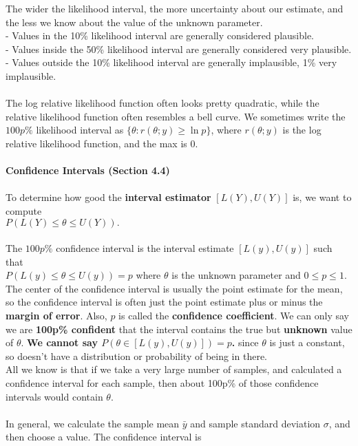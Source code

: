 \documentclass[a4paper,12pt]{article}
\begin{document}
The wider the likelihood interval, the more uncertainty about our estimate, and the less we know about the value of the unknown parameter. 
\\ - Values in the 10\% likelihood interval are generally considered plausible. 
\\ - Values inside the 50\% likelihood interval are generally considered very plausible. 
\\ - Values outside the 10\% likelihood interval are generally implausible, 1\% very implausible.
\\
\\The log relative likelihood function often looks pretty quadratic, while the relative likelihood function often resembles a bell curve. We sometimes write the $100p\%$ likelihood interval as 
$\{ \theta : r(\theta; y) \geq \ln p \}$,
where $r(\theta; y)$ is the log relative likelihood function, and the max is 0.
\\
\\\textbf{Confidence Intervals (Section 4.4)}
\\
\\ To determine how good the\textbf{ interval estimator} $[L(Y), U(Y)]$ is, we want to compute 
\\$ P(L(Y) \leq \theta \leq U(Y)).$
\\
\\The $100p\%$ confidence interval is the interval estimate $
[L(y), U(y)]$
such that 
\\$ P(L(y) \leq \theta \leq U(y)) = p$
where $\theta$ is the unknown parameter and $0 \leq p \leq 1$. \\The center of the confidence interval is usually the point estimate for the mean, so the confidence interval is often just the point estimate plus or minus the \textbf{margin of error}. Also, $p$ is called the \textbf{confidence coefficient}.
\newpage
We can only say we are \textbf{100p\% confident} that the interval
contains the true but \textbf{unknown} value of $\theta$. \textbf{We cannot say $P(\theta \in [L(y), U(y)]) = p$.} since $\theta$ is just a constant, so doesn't have a distribution or probability of being in there.
\\ All we know is that if we take a very large number of
samples, and calculated a confidence interval for each sample, then about 100p\% of those confidence intervals would contain
$\theta$.
\\
\\In general, we calculate the sample mean $\bar{y}$ and sample standard deviation $\sigma$, and then choose a value. The confidence interval is 
\end{document}

